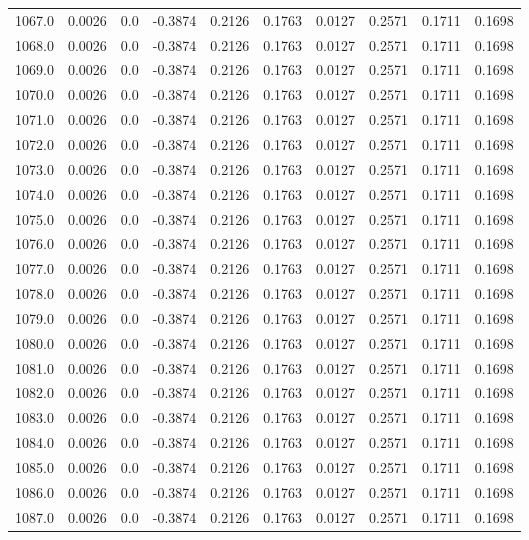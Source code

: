 \begin{longtable}{lrrrrrrrrr}
1067.0 & 0.0026 & 0.0 & -0.3874 & 0.2126 & 0.1763 & 0.0127 & 0.2571 & 0.1711 & 0.1698 \\
1068.0 & 0.0026 & 0.0 & -0.3874 & 0.2126 & 0.1763 & 0.0127 & 0.2571 & 0.1711 & 0.1698 \\
1069.0 & 0.0026 & 0.0 & -0.3874 & 0.2126 & 0.1763 & 0.0127 & 0.2571 & 0.1711 & 0.1698 \\
1070.0 & 0.0026 & 0.0 & -0.3874 & 0.2126 & 0.1763 & 0.0127 & 0.2571 & 0.1711 & 0.1698 \\
1071.0 & 0.0026 & 0.0 & -0.3874 & 0.2126 & 0.1763 & 0.0127 & 0.2571 & 0.1711 & 0.1698 \\
1072.0 & 0.0026 & 0.0 & -0.3874 & 0.2126 & 0.1763 & 0.0127 & 0.2571 & 0.1711 & 0.1698 \\
1073.0 & 0.0026 & 0.0 & -0.3874 & 0.2126 & 0.1763 & 0.0127 & 0.2571 & 0.1711 & 0.1698 \\
1074.0 & 0.0026 & 0.0 & -0.3874 & 0.2126 & 0.1763 & 0.0127 & 0.2571 & 0.1711 & 0.1698 \\
1075.0 & 0.0026 & 0.0 & -0.3874 & 0.2126 & 0.1763 & 0.0127 & 0.2571 & 0.1711 & 0.1698 \\
1076.0 & 0.0026 & 0.0 & -0.3874 & 0.2126 & 0.1763 & 0.0127 & 0.2571 & 0.1711 & 0.1698 \\
1077.0 & 0.0026 & 0.0 & -0.3874 & 0.2126 & 0.1763 & 0.0127 & 0.2571 & 0.1711 & 0.1698 \\
1078.0 & 0.0026 & 0.0 & -0.3874 & 0.2126 & 0.1763 & 0.0127 & 0.2571 & 0.1711 & 0.1698 \\
1079.0 & 0.0026 & 0.0 & -0.3874 & 0.2126 & 0.1763 & 0.0127 & 0.2571 & 0.1711 & 0.1698 \\
1080.0 & 0.0026 & 0.0 & -0.3874 & 0.2126 & 0.1763 & 0.0127 & 0.2571 & 0.1711 & 0.1698 \\
1081.0 & 0.0026 & 0.0 & -0.3874 & 0.2126 & 0.1763 & 0.0127 & 0.2571 & 0.1711 & 0.1698 \\
1082.0 & 0.0026 & 0.0 & -0.3874 & 0.2126 & 0.1763 & 0.0127 & 0.2571 & 0.1711 & 0.1698 \\
1083.0 & 0.0026 & 0.0 & -0.3874 & 0.2126 & 0.1763 & 0.0127 & 0.2571 & 0.1711 & 0.1698 \\
1084.0 & 0.0026 & 0.0 & -0.3874 & 0.2126 & 0.1763 & 0.0127 & 0.2571 & 0.1711 & 0.1698 \\
1085.0 & 0.0026 & 0.0 & -0.3874 & 0.2126 & 0.1763 & 0.0127 & 0.2571 & 0.1711 & 0.1698 \\
1086.0 & 0.0026 & 0.0 & -0.3874 & 0.2126 & 0.1763 & 0.0127 & 0.2571 & 0.1711 & 0.1698 \\
1087.0 & 0.0026 & 0.0 & -0.3874 & 0.2126 & 0.1763 & 0.0127 & 0.2571 & 0.1711 & 0.1698 \\

\end{longtable}
